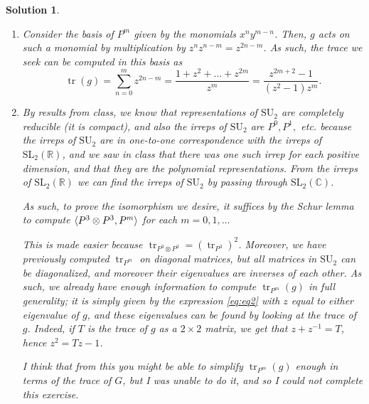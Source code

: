 \documentclass{article}
\theoremstyle{nonumberplain}
\newtheorem{sol}{Solution}
\newcommand{\R}{\mathbb{R}}
\newcommand{\C}{\mathbb{C}}
\DeclareMathOperator{\trace}{tr}
\DeclarePairedDelimiter{\braket}{\langle}{\rangle}
\newcommand{\SL}{\mathrm{SL}}
\newcommand{\SU}{\mathrm{SU}}
\begin{document}
\begin{sol}
\leavevmode
\begin{enumerate}
\item Consider the basis of $P^m$ given by the monomials $x^n y^{m-n}$. Then, $g$ acts on such a monomial by multiplication by $z^n z^{n-m} = z^{2n-m}$. As such, the trace we seek can be computed in this basis as
\begin{equation}\label{eq:eq2}
\trace(g) = \sum_{n=0}^m z^{2n-m} = \frac{1 + z^2 + \dots + z^{2m}}{z^m} = \frac{z^{2m + 2} - 1}{(z^2 - 1)z^m}.
\end{equation}
\item By results from class, we know that representations of $\SU_2$ are completely reducible (it is compact), and also the irreps of $\SU_2$ are $P^0, P^1,$ etc. because the irreps of $\SU_2$ are in one-to-one correspondence with the irreps of $\SL_2(\R)$, and we saw in class that there was one such irrep for each positive dimension, and that they are the polynomial representations. From the irreps of $\SL_2(\R)$ we can find the irreps of $\SU_2$ by passing through $\SL_2(\C)$.

As such, to prove the isomorphism we desire, it suffices by the Schur lemma to compute $\braket{P^3 \otimes P^3, P^m}$ for each $m = 0, 1, \dots$

This is made easier because $\trace_{P^3 \otimes P^3} = (\trace_{P^3})^2$. 	Moreover, we have previously computed $\trace_{P^m}$ on diagonal matrices, but all matrices in $\SU_2$ can be diagonalized, and moreover their eigenvalues are inverses of each other. As such, we already have enough information to compute $\trace_{P^m}(g)$ in full generality; it is simply given by the expression \eqref{eq:eq2} with $z$ equal to either eigenvalue of $g$, and these eigenvalues can be found by looking at the trace of $g$. Indeed, if $T$ is the trace of $g$ as a $2 \times 2$ matrix, we get that $z + z^{-1} = T$, hence $z^2 = Tz - 1$.

I think that from this you might be able to simplify $\trace_{P^m}(g)$ enough in terms of the trace of $G$, but I was unable to do it, and so I could not complete this exercise.
\end{enumerate}
\end{sol}
\end{document}
